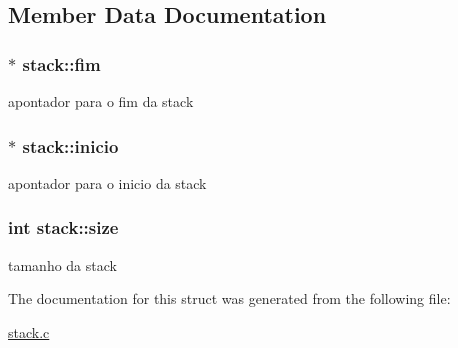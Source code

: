 \subsection{Member Data Documentation}
\hypertarget{structstack_a802d8229341bbd71d5ef20c499753070}{
\subsubsection[{fim}]{$\ast$ stack\+::fim}}\label{structstack_a802d8229341bbd71d5ef20c499753070}
apontador para o fim da stack \hypertarget{structstack_ab847cafd4234504d5eed198cf88cbbf8}{
\subsubsection[{inicio}]{$\ast$ stack\+::inicio}}\label{structstack_ab847cafd4234504d5eed198cf88cbbf8}
apontador para o inicio da stack \hypertarget{structstack_a926a597bae913d1bf4772be35c14b71e}{
\subsubsection[{size}]{\setlength{\rightskip}{0pt plus 5cm}int stack\+::size}}\label{structstack_a926a597bae913d1bf4772be35c14b71e}
tamanho da stack 

The documentation for this struct was generated from the following file\+:\begin{DoxyCompactItemize}
\item 
\hyperlink{stack_8c}{stack.\+c}\end{DoxyCompactItemize}
